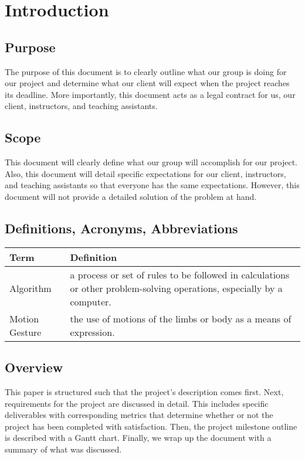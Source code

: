 \documentclass[onecolumn, draftclsnofoot,10pt, journal, letterpaper]{IEEEtran}
\begin{document}
\newpage
\section{Introduction}
    \subsection{Purpose}
        The purpose of this document is to clearly outline what our group is doing for our project and determine what our client will expect when the project reaches its deadline. More importantly, this document acts as a legal contract for us, our client, instructors, and teaching assistants. 
    \subsection{Scope}
        This document will clearly define what our group will accomplish for our project. Also, this document will detail specific expectations for our client, instructors, and teaching assistants so that everyone has the same expectations. However, this document will not provide a detailed solution of the problem at hand. 
    
    \subsection{Definitions, Acronyms, Abbreviations}
        \begin{center}
        \begin{tabular}{ | l | p{13cm} | }
            \hline
            Term & Definition \\
            \hline
            \hline
            Algorithm & a process or set of rules to be followed in calculations or other problem-solving operations, especially by a computer.  \\ 
            \hline
            Motion Gesture & the use of motions of the limbs or body as a means of expression. \\ 
            \hline
        \end{tabular}
        \end{center}
        
    \subsection{Overview}
        This paper is structured such that the project's description comes first. Next, requirements for the project are discussed in detail. This includes specific deliverables with corresponding metrics that determine whether or not the project has been completed with satisfaction. Then, the project milestone outline is described with a Gantt chart. Finally, we wrap up the document with a summary of what was discussed. 
\end{document}
